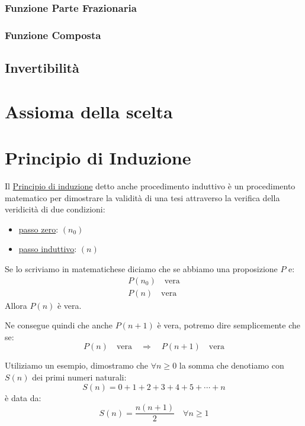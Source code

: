 \documentclass{article}
\begin{document}
\subsubsection{Funzione Parte Frazionaria}
\subsubsection{Funzione Composta}


\subsection{Invertibilità}

\newpage
\section{Assioma della scelta}



\newpage
\section{Principio di Induzione}
Il \underline{Principio di induzione} detto anche procedimento induttivo è un procedimento matematico per dimostrare la validità di una tesi attraverso la verifica della veridicità di due condizioni:
\begin{itemize}
        \item \underline{passo zero}: $(n_0)$
        \item \underline{passo induttivo}: $(n)$
\end{itemize}
Se lo scriviamo in matematichese diciamo che se abbiamo una proposizione $P$ e:
\begin{align*}
        P(n_0) \quad \mbox{vera} \\
        P(n) \quad \mbox{vera}
\end{align*}
Allora $P(n)$ è vera. \par
Ne consegue quindi che anche $P(n+1)$ è vera, potremo dire semplicemente che se:
\begin{equation*}
        P(n) \quad \mbox{vera} \quad \Rightarrow \quad P(n+1) \quad \mbox{vera}
\end{equation*}

Utiliziamo un esempio, dimostramo che $\forall n \ge 0$ la somma che denotiamo con $S(n)$ dei primi numeri naturali:
\begin{equation*}
        S(n) = 0 + 1 + 2 + 3 + 4 + 5 + \cdots + n
\end{equation*}
è data da:
\begin{equation*}
        S(n) = \frac{n(n+1)}{2} \quad \forall n \ge 1
\end{equation*}
\end{document}
